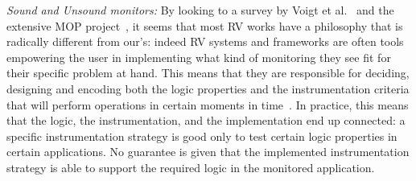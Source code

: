 

\newcommand\sepItems{\saveSpace\saveSpace\saveSpace\\*${}_{}$\\*${}_{}\,\bullet\,$}

\noindent\textit{Sound and Unsound monitors:}
By looking to a survey by Voigt et al.~\cite{Voigt2013} and the extensive MOP project~\cite{meredith2012overview},
it seems that most RV works have a philosophy that is radically different from our’s:
indeed RV systems and frameworks are often tools empowering the user
in implementing what kind of monitoring they see fit for their specific problem at hand.
This means that they are responsible for deciding, designing and encoding both the 
logic properties and the instrumentation criteria that will perform operations
in certain moments in time~\cite{meredith2012overview}.
In practice, this means that the logic, the instrumentation, and the implementation end up connected:
a specific instrumentation strategy is good only to test certain logic properties in certain applications.
No guarantee is given that the implemented instrumentation strategy is able to support
the required logic in the monitored application.

%
%

